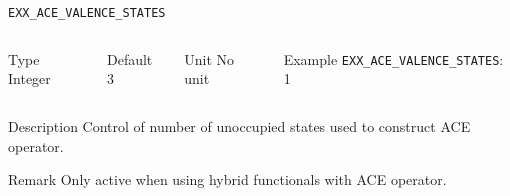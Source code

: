 \documentclass[xcolor=dvipsnames,t]{beamer}
\begin{document}
\begin{frame}[allowframebreaks]{\texttt{EXX\_ACE\_VALENCE\_STATES}} \label{EXX_ACE_VALENCE_STATES}
\vspace*{-12pt}
\begin{columns}
\begin{block}{Type}
Integer
\end{block}

\begin{block}{Default}
3
\end{block}

\begin{block}{Unit}
No unit
\end{block}

\begin{block}{Example}
\texttt{EXX\_ACE\_VALENCE\_STATES}: 1
\end{block}
\end{columns}

\begin{block}{Description}
Control of number of unoccupied states used to construct ACE operator.
\end{block}

\begin{block}{Remark}
Only active when using hybrid functionals with ACE operator. 
\end{block}

\end{frame}
\end{document}

